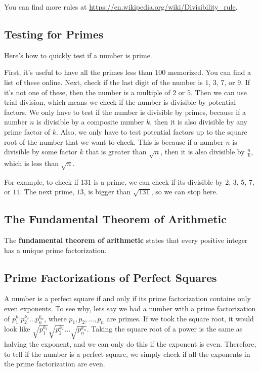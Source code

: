 \documentclass[twocolumn]{article}
\begin{document}
You can find more rules at \url{https://en.wikipedia.org/wiki/Divisibility_rule}.

\subsection*{Testing for Primes}
Here's how to quickly test if a number is prime.

First, it's useful to have all the primes less than $100$ memorized.
You can find a list of these online.
Next, check if the last digit of the number is $1$, $3$, $7$, or $9$.
If it's not one of these, then the number is a multiple of $2$ or $5$.
Then we can use trial division, which means we check if the number is divisible
by potential factors.
We only have to test if the number is divisible by primes,
because if a number $n$ is divisible by a composite number $k$,
then it is also divisible by any prime factor of $k$.
Also, we only have to test potential factors up to the square root of the number
that we want to check.
This is because if a number $n$ is divisible by some factor $k$ that is greater than $\sqrt{n}$,
then it is also divisible by $\frac{n}{k}$, which is less than $\sqrt{n}$.

For example, to check if $131$ is a prime, we can check if its divisible by
$2$, $3$, $5$, $7$, or $11$.
The next prime, $13$, is bigger than $\sqrt{131}$, so we can stop here.

\subsection*{The Fundamental Theorem of Arithmetic}
The \textbf{fundamental theorem of arithmetic} states that every positive integer
has a unique prime factorization.

\subsection*{Prime Factorizations of Perfect Squares}
A number is a perfect square if and only if its prime factorization contains only even exponents.
To see why, lets say we had a number with a prime factorization of
$p_1^{k_1} p_2^{k_2} \dots p_n^{k_n}$, where $p_1, p_2, \dots, p_n$ are primes.
If we took the square root, it would look like
$\sqrt{p_1^{k_1}} \sqrt{p_2^{k_2}} \dots \sqrt{p_n^{k_n}}$.
Taking the square root of a power is the same as halving the exponent,
and we can only do this if the exponent is even.
Therefore, to tell if the number is a perfect square, we simply check if all the exponents
in the prime factorization are even.
\end{document}

